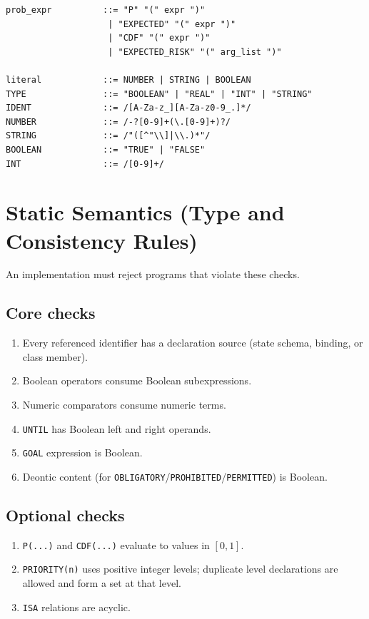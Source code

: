 \documentclass[11pt,a4paper]{article}
\begin{document}
\begin{lstlisting}
prob_expr          ::= "P" "(" expr ")"
                    | "EXPECTED" "(" expr ")"
                    | "CDF" "(" expr ")"
                    | "EXPECTED_RISK" "(" arg_list ")"

literal            ::= NUMBER | STRING | BOOLEAN
TYPE               ::= "BOOLEAN" | "REAL" | "INT" | "STRING"
IDENT              ::= /[A-Za-z_][A-Za-z0-9_.]*/
NUMBER             ::= /-?[0-9]+(\.[0-9]+)?/
STRING             ::= /"([^"\\]|\\.)*"/
BOOLEAN            ::= "TRUE" | "FALSE"
INT                ::= /[0-9]+/
\end{lstlisting}

\section{Static Semantics (Type and Consistency Rules)}
An implementation must reject programs that violate these checks.

\subsection{Core checks}
\begin{enumerate}[leftmargin=*]
  \item Every referenced identifier has a declaration source (state schema, binding, or class member).
  \item Boolean operators consume Boolean subexpressions.
  \item Numeric comparators consume numeric terms.
  \item \texttt{UNTIL} has Boolean left and right operands.
  \item \texttt{GOAL} expression is Boolean.
  \item Deontic content (for \texttt{OBLIGATORY}/\texttt{PROHIBITED}/\texttt{PERMITTED}) is Boolean.
\end{enumerate}

\subsection{Optional checks}
\begin{enumerate}[leftmargin=*]
  \item \texttt{P(...)} and \texttt{CDF(...)} evaluate to values in $[0,1]$.
  \item \texttt{PRIORITY(n)} uses positive integer levels; duplicate level declarations are allowed and form a set at that level.
  \item \texttt{ISA} relations are acyclic.
\end{enumerate}
\end{document}
